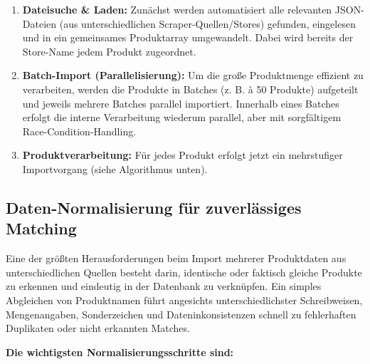 \documentclass[12pt, a4paper]{report} %
\begin{document}
\begin{enumerate}
    \item \textbf{Dateisuche \& Laden:} Zunächst werden automatisiert alle relevanten JSON-Dateien (aus unterschiedlichen Scraper-Quellen/Stores) gefunden, eingelesen und in ein gemeinsames Produktarray umgewandelt. Dabei wird bereits der Store-Name jedem Produkt zugeordnet.
    \item \textbf{Batch-Import (Parallelisierung):} Um die große Produktmenge effizient zu verarbeiten, werden die Produkte in Batches (z. B. à 50 Produkte) aufgeteilt und jeweils mehrere Batches parallel importiert. Innerhalb eines Batches erfolgt die interne Verarbeitung wiederum parallel, aber mit sorgfältigem Race-Condition-Handling.
    \item \textbf{Produktverarbeitung:} Für jedes Produkt erfolgt jetzt ein mehrstufiger Importvorgang (siehe Algorithmus unten).
\end{enumerate}

\subsection{Daten-Normalisierung für zuverlässiges Matching}

Eine der größten Herausforderungen beim Import mehrerer Produktdaten aus unterschiedlichen Quellen besteht darin, identische oder faktisch gleiche Produkte zu erkennen und eindeutig in der Datenbank zu verknüpfen. Ein simples Abgleichen von Produktnamen führt angesichts unterschiedlichster Schreibweisen, Mengenangaben, Sonderzeichen und Dateninkonsistenzen schnell zu fehlerhaften Duplikaten oder nicht erkannten Matches.

\textbf{Die wichtigsten Normalisierungsschritte sind:}
\end{document}

